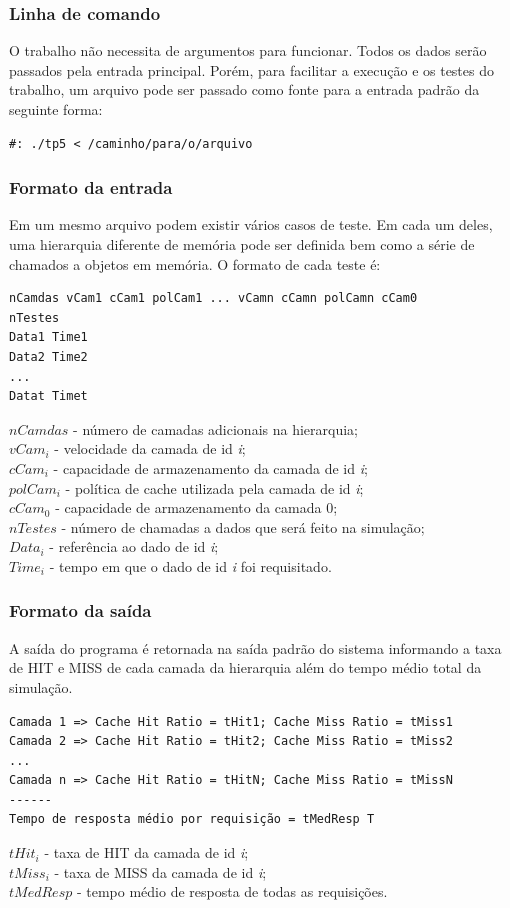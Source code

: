 \documentclass[12pt]{article}
\begin{document}
\subsubsection{Linha de comando}
O trabalho não necessita de argumentos para funcionar. Todos os dados serão passados pela entrada principal. Porém, para facilitar a execução e os testes do trabalho, um arquivo pode ser passado como fonte para a entrada padrão da seguinte forma:

\begin{verbatim}
#: ./tp5 < /caminho/para/o/arquivo
\end{verbatim}

\subsubsection{Formato da entrada}
Em um mesmo arquivo podem existir vários casos de teste. Em cada um deles, uma hierarquia diferente de memória pode ser definida bem como a série de chamados a objetos em memória. O formato de cada teste é:
\begin{verbatim}
nCamdas vCam1 cCam1 polCam1 ... vCamn cCamn polCamn cCam0
nTestes
Data1 Time1
Data2 Time2
...
Datat Timet
\end{verbatim}$nCamdas$ - número de camadas adicionais na hierarquia; \\
$vCam_{i}$ - velocidade da camada de id \textit{i}; \\
$cCam_{i}$ - capacidade de armazenamento da camada de id \textit{i}; \\
$polCam_{i}$ - política de cache utilizada pela camada de id \textit{i}; \\
$cCam_{0}$ - capacidade de armazenamento da camada 0; \\
$nTestes$ - número de chamadas a dados que será feito na simulação; \\
$Data_{i}$ - referência ao dado de id \textit{i}; \\
$Time_{i}$ - tempo em que o dado de id \textit{i} foi requisitado.

\subsubsection{Formato da saída}
A saída do programa é retornada na saída padrão do sistema informando a taxa de HIT e MISS de cada camada da hierarquia além do tempo médio total da simulação.
\begin{verbatim}
Camada 1 => Cache Hit Ratio = tHit1; Cache Miss Ratio = tMiss1
Camada 2 => Cache Hit Ratio = tHit2; Cache Miss Ratio = tMiss2
...
Camada n => Cache Hit Ratio = tHitN; Cache Miss Ratio = tMissN
------
Tempo de resposta médio por requisição = tMedResp T
\end{verbatim}$tHit_{i}$ - taxa de HIT da camada de id \textit{i}; \\
$tMiss_{i}$ - taxa de MISS da camada de id \textit{i}; \\
$tMedResp$ - tempo médio de resposta de todas as requisições.
\end{document}
